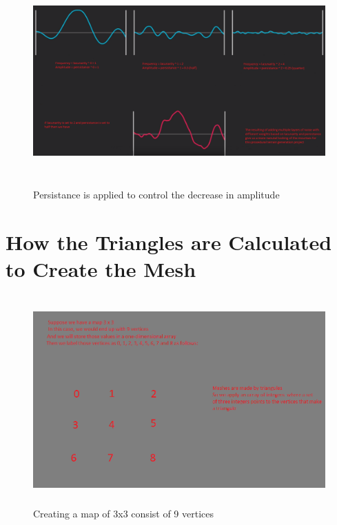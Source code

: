 \documentclass[a4paper,12pt]{book}
\begin{document}
\begin{figure}
\begin{center}
\includegraphics[height=80mm]{3noise-maps-octaves-5.png}
\end{center}
\caption{Persistance is applied to control the decrease in amplitude}
\label{fig:pretty}
\end{figure}


\section{How the Triangles are Calculated to Create the Mesh}

\begin{figure}
\begin{center}
\includegraphics[height=80mm]{mesh_research_1.png}
\end{center}
\caption{Creating a map of 3x3 consist of 9 vertices}
\label{fig:pretty}
\end{figure}
\end{document}
